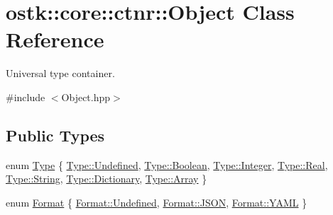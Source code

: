 \hypertarget{classostk_1_1core_1_1ctnr_1_1_object}{}\section{ostk\+:\+:core\+:\+:ctnr\+:\+:Object Class Reference}
\label{classostk_1_1core_1_1ctnr_1_1_object}


Universal type container.  




{\ttfamily \#include $<$Object.\+hpp$>$}

\subsection*{Public Types}
\begin{DoxyCompactItemize}
\item 
enum \hyperlink{classostk_1_1core_1_1ctnr_1_1_object_a49b70d4dce2d24126cd1df9aaf04d1ea}{Type} \{ \newline
\hyperlink{classostk_1_1core_1_1ctnr_1_1_object_a49b70d4dce2d24126cd1df9aaf04d1eaaec0fc0100c4fc1ce4eea230c3dc10360}{Type\+::\+Undefined}, 
\hyperlink{classostk_1_1core_1_1ctnr_1_1_object_a49b70d4dce2d24126cd1df9aaf04d1eaa27226c864bac7454a8504f8edb15d95b}{Type\+::\+Boolean}, 
\hyperlink{classostk_1_1core_1_1ctnr_1_1_object_a49b70d4dce2d24126cd1df9aaf04d1eaaa0faef0851b4294c06f2b94bb1cb2044}{Type\+::\+Integer}, 
\hyperlink{classostk_1_1core_1_1ctnr_1_1_object_a49b70d4dce2d24126cd1df9aaf04d1eaa7f80fcc452c2f1ed2bb51b39d0864df1}{Type\+::\+Real}, 
\newline
\hyperlink{classostk_1_1core_1_1ctnr_1_1_object_a49b70d4dce2d24126cd1df9aaf04d1eaa27118326006d3829667a400ad23d5d98}{Type\+::\+String}, 
\hyperlink{classostk_1_1core_1_1ctnr_1_1_object_a49b70d4dce2d24126cd1df9aaf04d1eaa3beb75d1563ebc22253341be4ce57f44}{Type\+::\+Dictionary}, 
\hyperlink{classostk_1_1core_1_1ctnr_1_1_object_a49b70d4dce2d24126cd1df9aaf04d1eaa4410ec34d9e6c1a68100ca0ce033fb17}{Type\+::\+Array}
 \}
\item 
enum \hyperlink{classostk_1_1core_1_1ctnr_1_1_object_a3266b14cf7e3df39858f6572120e3b24}{Format} \{ \hyperlink{classostk_1_1core_1_1ctnr_1_1_object_a3266b14cf7e3df39858f6572120e3b24aec0fc0100c4fc1ce4eea230c3dc10360}{Format\+::\+Undefined}, 
\hyperlink{classostk_1_1core_1_1ctnr_1_1_object_a3266b14cf7e3df39858f6572120e3b24a0ecd11c1d7a287401d148a23bbd7a2f8}{Format\+::\+J\+S\+ON}, 
\hyperlink{classostk_1_1core_1_1ctnr_1_1_object_a3266b14cf7e3df39858f6572120e3b24a9463f87bbed1fcdacfb8d40e185ca2bc}{Format\+::\+Y\+A\+ML}
 \}
\end{DoxyCompactItemize}
